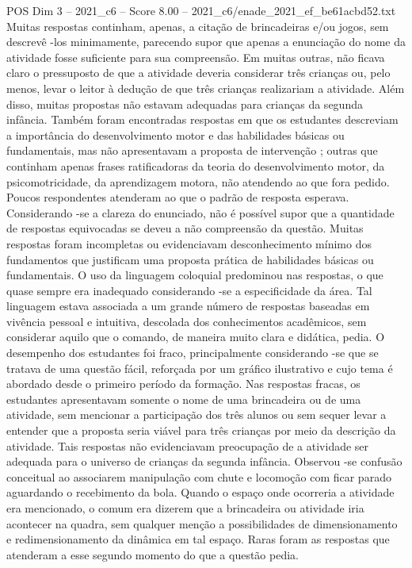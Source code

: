 \begin{textsample}{POS Dim 3 – 2021\_c6 – Score 8.00 – 2021\_c6/enade\_2021\_ef\_be61acbd52.txt}
Muitas respostas continham, apenas, a citação de brincadeiras e/ou jogos, sem descrevê -los minimamente, parecendo supor que apenas a enunciação do nome da atividade fosse suficiente para sua compreensão.
Em muitas outras, não ficava claro o pressuposto de que a atividade deveria considerar três crianças ou, pelo menos, levar o leitor à dedução de que três crianças realizariam a atividade.
Além disso, muitas propostas não estavam adequadas para crianças da segunda infância.
Também foram encontradas respostas em que os estudantes descreviam a importância do desenvolvimento motor e das habilidades básicas ou fundamentais, mas não apresentavam a proposta de intervenção ; outras que continham apenas frases ratificadoras da teoria do desenvolvimento motor, da psicomotricidade, da aprendizagem motora, não atendendo ao que fora pedido.
Poucos respondentes atenderam ao que o padrão de resposta esperava.
Considerando -se a clareza do enunciado, não é possível supor que a quantidade de respostas equivocadas se deveu a não compreensão da questão.
Muitas respostas foram incompletas ou evidenciavam desconhecimento mínimo dos fundamentos que justificam uma proposta prática de habilidades básicas ou fundamentais.
O uso da linguagem coloquial predominou nas respostas, o que quase sempre era inadequado considerando -se a especificidade da área.
Tal linguagem estava associada a um grande número de respostas baseadas em vivência pessoal e intuitiva, descolada dos conhecimentos acadêmicos, sem considerar aquilo que o comando, de maneira muito clara e didática, pedia.
O desempenho dos estudantes foi fraco, principalmente considerando -se que se tratava de uma questão fácil, reforçada por um gráfico ilustrativo e cujo tema é abordado desde o primeiro período da formação.
Nas respostas fracas, os estudantes apresentavam somente o nome de uma brincadeira ou de uma atividade, sem mencionar a participação dos três alunos ou sem sequer levar a entender que a proposta seria viável para três crianças por meio da descrição da atividade.
Tais respostas não evidenciavam preocupação de a atividade ser adequada para o universo de crianças da segunda infância.
Observou -se confusão conceitual ao associarem manipulação com chute e locomoção com ficar parado aguardando o recebimento da bola.
Quando o espaço onde ocorreria a atividade era mencionado, o comum era dizerem que a brincadeira ou atividade iria acontecer na quadra, sem qualquer menção a possibilidades de dimensionamento e redimensionamento da dinâmica em tal espaço.
Raras foram as respostas que atenderam a esse segundo momento do que a questão pedia.

\end{textsample}
